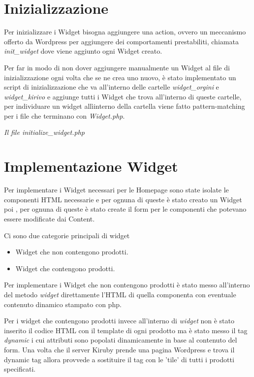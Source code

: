 \newpage

\section{Inizializzazione}
Per inizializzare i Widget bisogna aggiungere una action\cite{WPACTION}, ovvero un meccanismo offerto da Wordpress per aggiungere dei comportamenti
prestabiliti,  chiamata \emph{init\_widget} dove viene aggiunto ogni Widget creato.

Per far in modo di non dover aggiungere manualmente un Widget al file di inizializzazione ogni volta che se ne crea uno nuovo, è
stato implementato un script di inizializzazione che va all'interno delle cartelle \emph{widget\_orgini} e \emph{widget\_kirivo} e aggiunge tutti
i Widget che trova all'interno di queste cartelle, per individuare un widget allìinterno della cartella viene fatto pattern-matching per i file che terminano con \emph{Widget.php}.


\emph{Il file initialize\_widget.php}

\newpage

\section{Implementazione Widget}
Per implementare i Widget necessari per le Homepage sono state isolate le componenti HTML necessarie e per ognuna
di queste è stato creato un Widget poi , per ognuna di queste è stato create il form per le componenti che potevano essere
modificate dai Content.

Ci sono due categorie principali di widget
\begin{itemize}
\item Widget che non contengono prodotti.
\item Widget che contengono prodotti.
\end{itemize}

Per implementare i Widget che non contengono prodotti è stato messo all'interno del metodo \emph{widget} direttamente
l'HTML di quella componenta con eventuale contenuto dinamico stampato con php.

Per i widget che contengono prodotti invece all'interno di \emph{widget} non è stato inserito il codice HTML con il template
di ogni prodotto ma è stato messo il tag \emph{dynamic} i cui attributi sono popolati dinamicamente in base al contenuto del form.
Una volta che il server Kiruby prende una pagina Wordpress e trova il dynamic tag allora provvede a sostituire il tag con le 'tile'
di tutti i prodotti specificati.
